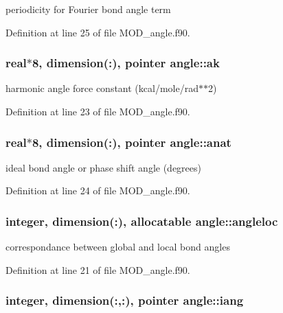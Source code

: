 periodicity for Fourier bond angle term 



Definition at line 25 of file M\-O\-D\-\_\-angle.\-f90.

\hypertarget{classangle_a87407ebe9a2d1916f37c0c6278f4778e}{
\subsubsection[{ak}]{\setlength{\rightskip}{0pt plus 5cm}real$\ast$8, dimension(\-:), pointer angle\-::ak}}\label{classangle_a87407ebe9a2d1916f37c0c6278f4778e}


harmonic angle force constant (kcal/mole/rad$\ast$$\ast$2) 



Definition at line 23 of file M\-O\-D\-\_\-angle.\-f90.

\hypertarget{classangle_ac2eed7a08f383a7d650b4e7ff7ed9bff}{
\subsubsection[{anat}]{\setlength{\rightskip}{0pt plus 5cm}real$\ast$8, dimension(\-:), pointer angle\-::anat}}\label{classangle_ac2eed7a08f383a7d650b4e7ff7ed9bff}


ideal bond angle or phase shift angle (degrees) 



Definition at line 24 of file M\-O\-D\-\_\-angle.\-f90.

\hypertarget{classangle_aba2bc32b2b8c849f07359000e638b674}{
\subsubsection[{angleloc}]{\setlength{\rightskip}{0pt plus 5cm}integer, dimension(\-:), allocatable angle\-::angleloc}}\label{classangle_aba2bc32b2b8c849f07359000e638b674}


correspondance between global and local bond angles 



Definition at line 21 of file M\-O\-D\-\_\-angle.\-f90.

\hypertarget{classangle_a43ce792d42ab6ec0953d3b0385e48710}{
\subsubsection[{iang}]{\setlength{\rightskip}{0pt plus 5cm}integer, dimension(\-:,\-:), pointer angle\-::iang}}\label{classangle_a43ce792d42ab6ec0953d3b0385e48710}


